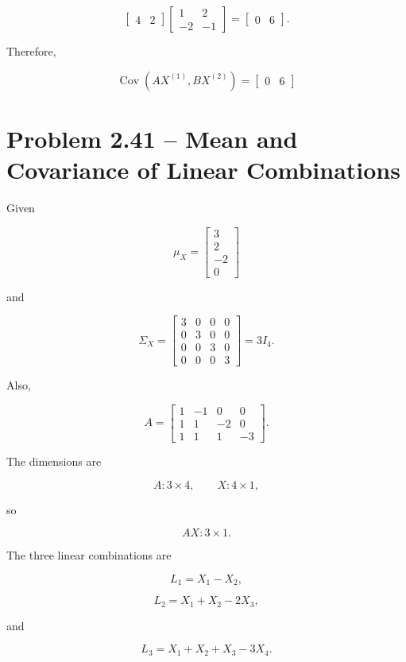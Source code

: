 \documentclass[12pt]{article}
\begin{document}
\[
\begin{bmatrix}
4&2
\end{bmatrix}
\begin{bmatrix}
1&2\\
-2&-1
\end{bmatrix}
=
\begin{bmatrix}
0&6
\end{bmatrix}.
\]

Therefore,

\[
\boxed{
\operatorname{Cov}(AX^{(1)},BX^{(2)})
=
\begin{bmatrix}
0&6
\end{bmatrix}}
\]

\section*{Problem 2.41 -- Mean and Covariance of Linear Combinations}

Given

\[
\mu_X=
\begin{bmatrix}
3\\
2\\
-2\\
0
\end{bmatrix}
\]

and

\[
\Sigma_X=
\begin{bmatrix}
3&0&0&0\\
0&3&0&0\\
0&0&3&0\\
0&0&0&3
\end{bmatrix}
=
3I_4.
\]

Also,

\[
A=
\begin{bmatrix}
1&-1&0&0\\
1&1&-2&0\\
1&1&1&-3
\end{bmatrix}.
\]

The dimensions are

\[
A:3\times4,
\qquad
X:4\times1,
\]

so

\[
AX:3\times1.
\]

The three linear combinations are

\[
L_1=X_1-X_2,
\]

\[
L_2=X_1+X_2-2X_3,
\]

and

\[
L_3=X_1+X_2+X_3-3X_4.
\]
\end{document}
